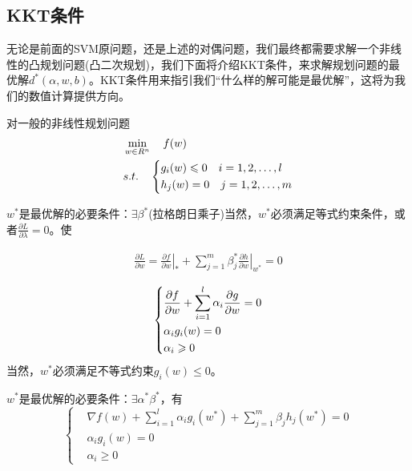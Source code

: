 	\subsection{KKT条件}
		\par
		无论是前面的SVM原问题，还是上述的对偶问题，我们最终都需要求解一个非线性的凸规划问题(凸二次规划)，我们下面将介绍KKT条件，来求解规划问题的最优解$d^*(\alpha,w,b)$。KKT条件用来指引我们“什么样的解可能是最优解”，这将为我们的数值计算提供方向。
		\par
		对一般的非线性规划问题
		\begin{align}
		& \min_{w\in R^n}\quad f(w)\\
		& s.t.\quad
		\left\{
		\begin{aligned}
		& g_i(w) \leqslant 0\quad i=1,2,\dots ,l \notag\\
		& h_j(w) = 0\quad j=1,2,\dots ,m \notag
		\end{aligned}
		\right.
		\end{align}
		\begin{lemma}[等式约束问题的最优解的一阶必要条件]
		$w^*$是最优解的必要条件：$\exists\beta^*$(拉格朗日乘子)当然，$w^*$必须满足等式约束条件，或者$\frac{\partial L}{\partial \lambda}=0$。使
		\end{lemma}
		\begin{align}
		\frac{\partial L}{\partial w} = \left. \frac{\partial f}{\partial w} \right|_*    + \sum_{j=1}^{m} \beta_j^* \left. \frac{\partial h}{\partial w} \right|_{w^*} = 0
		\end{align}
		\begin{lemma}
		\begin{equation*}
		\centering
		\left\{\begin{lgathered}
		\frac{\partial f}{\partial w} + \sum_{i=1}^{l} \alpha_i \frac{\partial g}{\partial w} = 0 \\
		\alpha_i g_i (w) = 0 \\
		\alpha_i \geqslant 0
		\end{lgathered} \right.
		\end{equation*}
		当然，$w^*$必须满足不等式约束$g_i(w) \leqslant 0$。
		\end{lemma}
		\begin{lemma}[含等式和不等式约束的最优解的一阶必要条件]
		$w^*$是最优解的必要条件：$\exists\alpha^*\beta^*$，有
		\[
		\left\{
		\begin{aligned}
		& \nabla f(w) + \sum_{i=1}^{l} \alpha_i g_i(w^*) + \sum_{j=1}^{m} \beta_j h_j (w^*) = 0 \\
		& \alpha_i g_i(w) = 0 \\
		& \alpha_i \geqslant 0
		\end{aligned}
		\right.
		\]
		\end{lemma}

